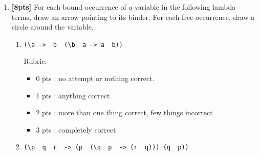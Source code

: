 \documentclass[paper=letter, fontsize=13pt]{article} %
\numberwithin{equation}{section} %
\newif\ifshowanswers\showanswerstrue
\begin{document}
\begin{enumerate}
\begin{enumerate}[label=(\Alph*)]
\item {\Large
\verb|(\x y -> (y x)) (\p q -> p) (\i -> i) (\j -> j)|
}
\ifshowanswers
\begin{itemize}
\item \verb|=b> (\y -> y (\p q -> p)) (\i -> i) (\j -> j)|
\item \verb|=b> (\i -> i) (\p q -> p) (\j -> j)|
\item \verb|=b> (\p q -> p) (\j -> j)|
\item \verb|=b> \q -> (\j -> j)|
\end{itemize}
Rubric:
\begin{itemize}
\item 0 pts : no attempt or nothing correct.
\item 1 pts : anything correct (e.g., one reduction)
\item 2-3 pts : more than one thing correct (e.g., two reductions), few things incorrect
\item 4 pts : almost correct, but one smallish error
\item 5 pts : completely correct
\end{itemize}
\fi
\end{enumerate}
\newpage

\item \textbf{[8pts]}  For each bound occurrence of a variable in the following lambda terms, 
draw an arrow pointing to its binder. For each free occurrence, draw a circle around the variable.

\bigskip
\bigskip
\bigskip

\begin{enumerate}[label=(\Alph*)]
\item {\Large
  \verb|(\a ->  b  (\b  a -> a  b))|
}
\ifshowanswers
Rubric:
\begin{itemize}
\item 0 pts : no attempt or nothing correct.
\item 1 pts : anything correct 
\item 2 pts : more than one thing correct, few things incorrect
\item 3 pts : completely correct
\end{itemize}
\else
\bigskip
\bigskip
\bigskip
\fi

\item {\Large
  \verb|(\p  q  r  -> (p  (\q  p  -> (r  q))) (q  p))|
}
\end{enumerate}

\bigskip
\bigskip
\bigskip


\end{enumerate}
\end{document}

